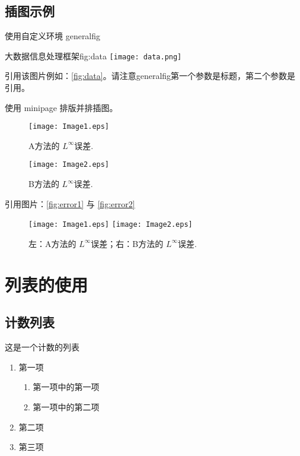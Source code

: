 \documentclass{shnuthesis}
\begin{document}
\section{插图示例}

使用自定义环境 generalfig

\begin{generalfig}[htb]{大数据信息处理框架}{fig:data}
		\texttt{[image: data.png]}
\end{generalfig}

引用该图片例如：\autoref{fig:data}。请注意generalfig第一个参数是标题，第二个参数是引用。

使用 minipage 排版并排插图。

\begin{figure}[htp!]
\begin{minipage}[t]{0.48\linewidth}
\centering
  \texttt{[image: Image1.eps]}
    \caption{A方法的 $L^\infty$误差.}
    \label{fig:error1}
\end{minipage}
  \hfill
\begin{minipage}[t]{0.48\linewidth}
\centering
   \texttt{[image: Image2.eps]}
   \caption{B方法的 $L^\infty$误差.}
   \label{fig:error2}
\end{minipage}
\end{figure}

引用图片：\autoref{fig:error1} 与 \autoref{fig:error2}

\clearpage
\begin{figure}[htp!]
\centering
  \texttt{[image: Image1.eps]} %
  \hfill
  \texttt{[image: Image2.eps]}
  \caption{左：A方法的 $L^\infty$误差；右：B方法的 $L^\infty$误差.}
  \label{fig:error}
\end{figure}

\chapter{列表的使用}

\section{计数列表}

这是一个计数的列表
\begin{enumerate}
	\item 第一项
		\begin{enumerate}
			\item 第一项中的第一项
			\item 第一项中的第二项
		\end{enumerate}
	\item 第二项
	\item 第三项
\end{enumerate}
\end{document}
